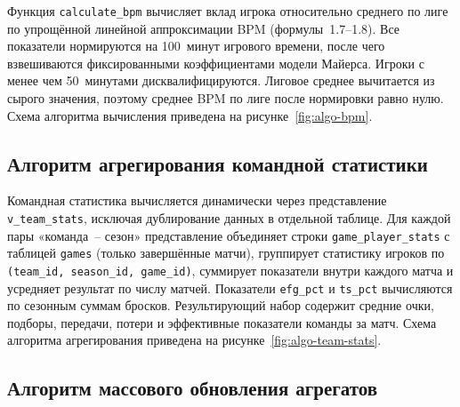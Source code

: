 Функция \texttt{calculate\_bpm} вычисляет вклад игрока относительно
среднего по лиге по упрощённой линейной аппроксимации BPM
(формулы~1.7--1.8). Все показатели нормируются на 100~минут игрового
времени, после чего взвешиваются фиксированными коэффициентами модели
Майерса. Игроки с менее чем 50~минутами дисквалифицируются. Лиговое среднее
вычитается из сырого значения, поэтому среднее BPM по лиге после нормировки
равно нулю.
Схема алгоритма вычисления приведена на рисунке~\ref{fig:algo-bpm}.
\flowchartCalculateBpm

\subsection{Алгоритм агрегирования командной статистики}

Командная статистика вычисляется динамически через представление
\texttt{v\_team\_stats}, исключая дублирование данных в отдельной таблице.
Для каждой пары «команда~-- сезон» представление объединяет строки
\texttt{game\_player\_stats} с таблицей \texttt{games} (только завершённые матчи),
группирует статистику игроков по \texttt{(team\_id, season\_id, game\_id)},
суммирует показатели внутри каждого матча и усредняет результат по числу матчей.
Показатели \texttt{efg\_pct} и \texttt{ts\_pct} вычисляются по сезонным суммам
бросков. Результирующий набор содержит средние очки, подборы, передачи, потери
и эффективные показатели команды за матч.
Схема алгоритма агрегирования приведена на рисунке~\ref{fig:algo-team-stats}.
\flowchartTeamStats

\subsection{Алгоритм массового обновления агрегатов}\label{subsec:bulk-update}

